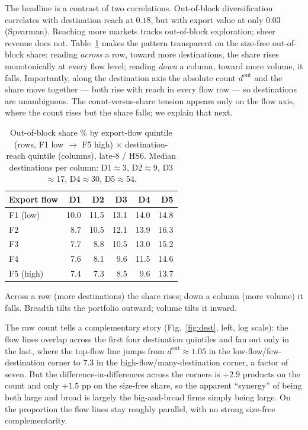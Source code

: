 \documentclass[11pt]{article}
\newcommand{\dout}{d^{\mathrm{out}}}
\begin{document}
The headline is a contrast of two correlations. Out-of-block diversification correlates with destination reach
at $0.18$, but with export value at only $0.03$ (Spearman). Reaching more markets tracks out-of-block
exploration; sheer revenue does not. Table~\ref{tab:destgrid} makes the pattern transparent on the size-free out-of-block share:
reading \emph{across} a row, toward more destinations, the share rises monotonically at every flow level;
reading \emph{down} a column, toward more volume, it falls. Importantly, along the destination axis the
absolute count $\dout$ and the share move together --- both rise with reach in every flow row --- so
destinations are unambiguous. The count-versus-share tension appears only on the flow axis, where the count
rises but the share falls; we explain that next.

\begin{table}[H]\centering\small
\caption{Out-of-block share \% by export-flow quintile (rows, F1 low $\to$ F5 high) $\times$
destination-reach quintile (columns), late-8 / HS6. Median destinations per column:
D1$\approx$3, D2$\approx$9, D3$\approx$17, D4$\approx$30, D5$\approx$54.}
\label{tab:destgrid}
\begin{tabular}{@{}lrrrrr@{}}
\toprule
Export flow & D1 & D2 & D3 & D4 & D5 \\
\midrule
F1 (low)  & 10.0 & 11.5 & 13.1 & 14.0 & 14.8 \\
F2        &  8.7 & 10.5 & 12.1 & 13.9 & 16.3 \\
F3        &  7.7 &  8.8 & 10.5 & 13.0 & 15.2 \\
F4        &  7.6 &  8.1 &  9.6 & 11.5 & 14.6 \\
F5 (high) &  7.4 &  7.3 &  8.5 &  9.6 & 13.7 \\
\bottomrule
\end{tabular}

\smallskip
\footnotesize Across a row (more destinations) the share rises; down a column (more volume) it falls.
Breadth tilts the portfolio outward; volume tilts it inward.
\end{table}

The raw count tells a complementary story (Fig.~\ref{fig:dest}, left, log scale): the flow lines overlap across
the first four destination quintiles and fan out only in the last, where the top-flow line jumps from
$\dout\approx1.05$ in the low-flow/few-destination corner to $7.3$ in the high-flow/many-destination corner, a
factor of seven. But the difference-in-differences across the corners is $+2.9$ products on the count and only
$+1.5$ pp on the size-free share, so the apparent ``synergy'' of being both large and broad is largely the
big-and-broad firms simply being large. On the proportion the flow lines stay roughly parallel, with no strong
size-free complementarity.
\end{document}
